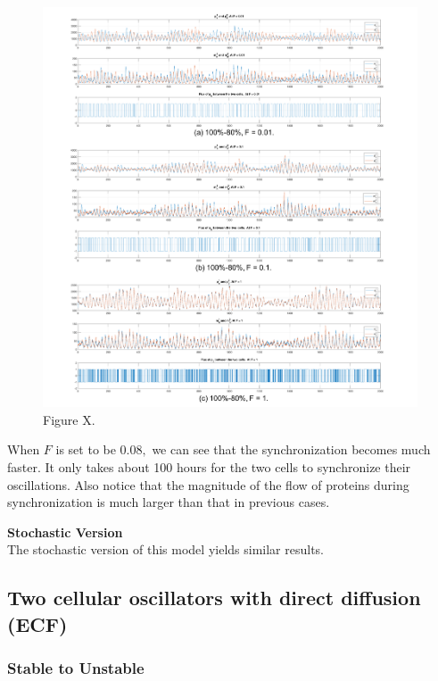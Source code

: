 \documentclass[12pt]{article}
\renewcommand{\(}{\left (}
\renewcommand{\)}{\right )}
\begin{document}
\begin{figure}[h]
    \centering
	\begin{minipage}{0.99\textwidth}
		\centering
		\includegraphics[width=0.99\textwidth]{sto_two_80_100_compare.png}
		\caption*{\small Figure X.}
	\end{minipage}
\end{figure}




When $F$ is set to be $0.08,$ we can see that the synchronization becomes much faster. It only takes about 100 hours for the two cells to synchronize their oscillations. Also notice that the magnitude of the flow of proteins during synchronization is much larger than that in previous cases.



\textbf{Stochastic Version}\\
\hspace{5mm} The stochastic version of this model yields similar results.


\subsection{Two cellular oscillators with direct diffusion (ECF)}

\subsubsection{Stable to Unstable}
\end{document}
